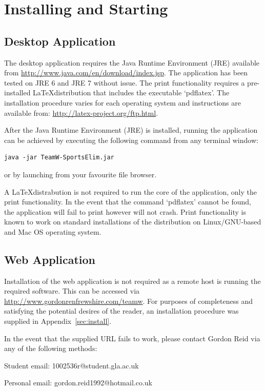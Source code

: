 \section{Installing and Starting}

\subsection{Desktop Application}

The desktop application requires the Java Runtime Environment (JRE) available
from \url{http://www.java.com/en/download/index.jsp}. The application has been
tested on JRE 6 and JRE 7 without issue. The print functionality
requires a pre-installed \LaTeX distribution that includes the
executable `pdflatex'. The installation procedure varies for each
operating system and instructions are available from:
\url{http://latex-project.org/ftp.html}.

After the Java Runtime Environment (JRE) is installed, running the application
can be achieved by executing the following command from any terminal
window:
\begin{verbatim}
java -jar TeamW-SportsElim.jar
\end{verbatim}
or by launching from your favourite file browser.

A \LaTeX distrabution is not required to run the core of the
application, only the print functionality. In the event that the
command `pdflatex' cannot be found, the application will fail to print
however will not crash. Print functionality is known to work on
standard installations of the distribution on Linux/GNU-based and Mac
OS operating system. 

\subsection{Web Application}

Installation of the web application is not required as a remote host is running
the required software. This can be accessed via
\url{http://www.gordonrenfrewshire.com/teamw}. For purposes of completeness and
satisfying the potential desires of the reader, an installation procedure was
supplied in Appendix~\ref{sec:install}.

In the event that the supplied URL fails to work, please contact Gordon Reid via
any of the following methods:

Student email: 1002536r@student.gla.ac.uk

Personal email: gordon.reid1992@hotmail.co.uk

